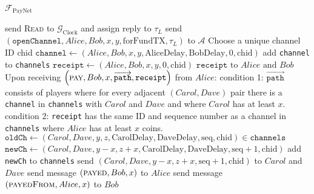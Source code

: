 \begin{functionality}{$\mathcal{F}_{\mathrm{PayNet}}$}
\begin{algorithmic}[1]
        \State send \textsc{Read} to $\mathcal{G}_{\mathrm{Clock}}$ and assign
        reply to $\tau_L$
        \State send $\left(\mathtt{openChannel}, Alice, Bob, x, y,
        \mathrm{forFundTX}, \tau_L\right)$ to $\mathcal{A}$ 
        \State Choose a unique channel ID chid
        \State $\mathtt{channel} \gets \left(Alice, Bob, x, y,
        \mathrm{AliceDelay}, \mathrm{BobDelay}, 0, \mathrm{chid}\right)$
        \State add \texttt{channel} to \texttt{channels}
        \State $\mathtt{receipt} \gets \left(Alice, Bob, x, y, 0,
        \mathrm{chid}\right)$
        \State \Return $\mathtt{receipt} \text{ to } Alice \text{ and } Bob$
      \EndIf
    \EndIndent
    \State {}
    \State {}
    \State Upon receiving $\left(\textsc{pay}, Bob, x,
    \overrightarrow{\mathtt{path}}, \mathtt{receipt}\right)$ from $Alice$:
    \Indent
      \State condition 1: $\overrightarrow{\mathtt{path}}$ consists of players
      where for every adjacent $\left(Carol, Dave\right)$ pair there is a
      \texttt{channel} in \texttt{channels} with $Carol$ and $Dave$ and where
      $Carol$ has at least $x$.
      \State condition 2: \texttt{receipt} has the same ID and sequence number
      as a channel in \texttt{channels} where $Alice$ has at least $x$ coins.
          \State $\mathtt{oldCh} \gets \left(Carol, Dave, y, z,
          \mathrm{CarolDelay}, \mathrm{DaveDelay}, \mathrm{seq},
          \mathrm{chid}\right) \in \mathtt{channels}$
          \State $\mathtt{newCh} \gets \left(Carol, Dave, y - x, z + x,
          \mathrm{CarolDelay}, \mathrm{DaveDelay}, \mathrm{seq} + 1,
          \mathrm{chid}\right)$
          \State add \texttt{newCh} to \texttt{channels}
          \State send $\left(Carol, Dave, y - x, z + x, \mathrm{seq} + 1,
          \mathrm{chid}\right)$ to $Carol$ and $Dave$ 
        \EndFor
        \State send message $\left(\textsc{payed}, Bob, x\right)$ to $Alice$
        \State send message $\left(\textsc{payedFrom}, Alice, x\right)$ to $Bob$

\end{algorithmic}
\end{functionality}
